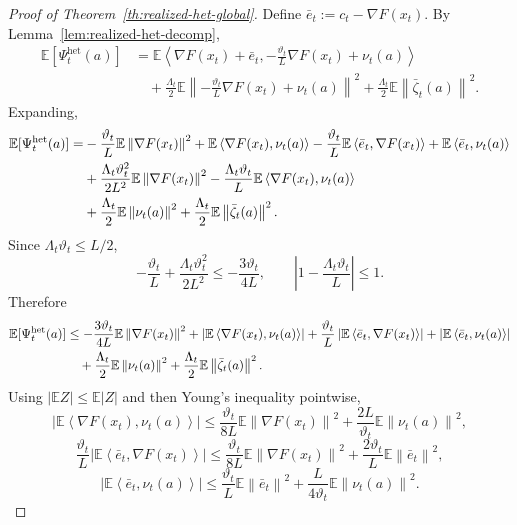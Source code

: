 \documentclass[10pt,a4paper]{amsart}
\newcommand{\EE}{\mathbb E}
\newcommand{\ip}[2]{\left\langle #1,#2\right\rangle}
\newcommand{\norm}[1]{\left\lVert #1\right\rVert}
\begin{document}
\begin{proof}[Proof of Theorem~\ref{th:realized-het-global}]
Define $\bar e_t:=c_t-\nabla F(x_t)$.
By Lemma~\ref{lem:realized-het-decomp},
\begin{align*}
\EE[\Psi_t^{\mathrm{het}}(a)]
&=
\EE\ip{\nabla F(x_t)+\bar e_t}{-\frac{\vartheta_t}{L}\nabla F(x_t)+\nu_t(a)}\\
&\quad+
\frac{\Lambda_t}{2}
\EE\left\|-\frac{\vartheta_t}{L}\nabla F(x_t)+\nu_t(a)\right\|^2
+
\frac{\Lambda_t}{2}\EE\norm{\bar\zeta_t(a)}^2.
\end{align*}
Expanding,
\begin{align*}
\EE[\Psi_t^{\mathrm{het}}(a)]
=
&-\frac{\vartheta_t}{L}\EE\norm{\nabla F(x_t)}^2
+\EE\ip{\nabla F(x_t)}{\nu_t(a)}
-\frac{\vartheta_t}{L}\EE\ip{\bar e_t}{\nabla F(x_t)}
+\EE\ip{\bar e_t}{\nu_t(a)}
\notag\\
&+
\frac{\Lambda_t\vartheta_t^2}{2L^2}\EE\norm{\nabla F(x_t)}^2
-
\frac{\Lambda_t\vartheta_t}{L}\EE\ip{\nabla F(x_t)}{\nu_t(a)}\\
&+
\frac{\Lambda_t}{2}\EE\norm{\nu_t(a)}^2
+
\frac{\Lambda_t}{2}\EE\norm{\bar\zeta_t(a)}^2.
\end{align*}
Since $\Lambda_t\vartheta_t\le L/2$,
\[
-\frac{\vartheta_t}{L}+\frac{\Lambda_t\vartheta_t^2}{2L^2}
\le
-\frac{3\vartheta_t}{4L},
\qquad
\left|1-\frac{\Lambda_t\vartheta_t}{L}\right|\le 1.
\]
Therefore
\begin{align}
\EE[\Psi_t^{\mathrm{het}}(a)]
&\le
-\frac{3\vartheta_t}{4L}\EE\norm{\nabla F(x_t)}^2
+
\left|\EE\ip{\nabla F(x_t)}{\nu_t(a)}\right|
+
\frac{\vartheta_t}{L}\left|\EE\ip{\bar e_t}{\nabla F(x_t)}\right|
+
\left|\EE\ip{\bar e_t}{\nu_t(a)}\right|
\notag\\
&\quad+
\frac{\Lambda_t}{2}\EE\norm{\nu_t(a)}^2
+
\frac{\Lambda_t}{2}\EE\norm{\bar\zeta_t(a)}^2.
\label{eq:realized-het-reduced}
\end{align}
Using $\left|\EE Z\right|\le \EE|Z|$
and then Young's inequality pointwise,
\begin{equation}
\left|\EE\ip{\nabla F(x_t)}{\nu_t(a)}\right|
\le
\frac{\vartheta_t}{8L}\EE\norm{\nabla F(x_t)}^2
+
\frac{2L}{\vartheta_t}\EE\norm{\nu_t(a)}^2,
\label{eq:realized-het-young1}\end{equation}
\[
\frac{\vartheta_t}{L}\left|\EE\ip{\bar e_t}{\nabla F(x_t)}\right|
\le
\frac{\vartheta_t}{8L}\EE\norm{\nabla F(x_t)}^2
+
\frac{2\vartheta_t}{L}\EE\norm{\bar e_t}^2,
\]
\begin{equation}
\left|\EE\ip{\bar e_t}{\nu_t(a)}\right|
\le
\frac{\vartheta_t}{L}\EE\norm{\bar e_t}^2
+
\frac{L}{4\vartheta_t}\EE\norm{\nu_t(a)}^2.
\label{eq:realized-het-young3}\end{equation}

\end{proof}
\end{document}
